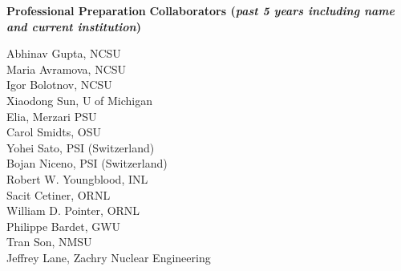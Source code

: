 \documentclass[11pt,letterpaper,english]{article}
\begin{document}
\begin{flushleft} {\bf Professional Preparation}
\vspace{-6pt}
{\bf Collaborators ({\emph{past 5 years including name and current institution}})}
{\parindent 16pt

Abhinav Gupta, NCSU \\
Maria Avramova, NCSU\\
Igor Bolotnov, NCSU \\
Xiaodong Sun, U of Michigan \\
Elia, Merzari PSU\\
Carol Smidts, OSU\\
Yohei Sato, PSI (Switzerland)\\
Bojan Niceno, PSI (Switzerland)\\
Robert W. Youngblood, INL \\
Sacit Cetiner, ORNL\\
William D. Pointer,	ORNL \\
Philippe Bardet, GWU\\
Tran Son, NMSU\\
Jeffrey Lane, Zachry Nuclear Engineering\\
}
\end{flushleft}
\end{document}

